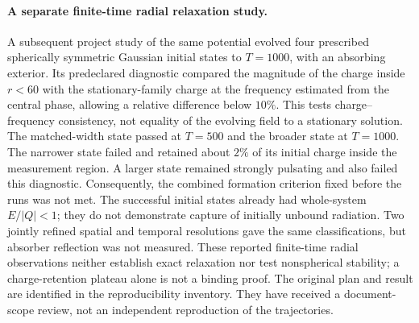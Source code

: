 \paragraph{A separate finite-time radial relaxation study.}
A subsequent project study of the same potential evolved four prescribed
spherically symmetric Gaussian initial states to $T=1000$, with an
absorbing exterior. Its predeclared diagnostic compared the magnitude of
the charge inside $r<60$ with the stationary-family charge at the
frequency estimated from the central phase, allowing a relative
difference below $10\%$. This tests charge--frequency consistency,
not equality of the evolving field to a stationary solution.
The matched-width state passed at $T=500$ and the broader state at
$T=1000$. The narrower state failed and retained about $2\%$ of its
initial charge inside the measurement region. A larger state remained
strongly pulsating and also failed this diagnostic. Consequently, the
combined formation criterion fixed before the runs was not met.
The successful initial states already had whole-system $E/|Q|<1$;
they do not demonstrate capture of initially unbound radiation.
Two jointly refined spatial and temporal resolutions gave the same
classifications, but absorber reflection was not measured. These reported
finite-time radial observations neither establish exact relaxation nor
test nonspherical stability; a charge-retention plateau alone is not a
binding proof. The original plan and result are identified in the
reproducibility inventory. They have received a document-scope review,
not an independent reproduction of the trajectories.




\clearpage



